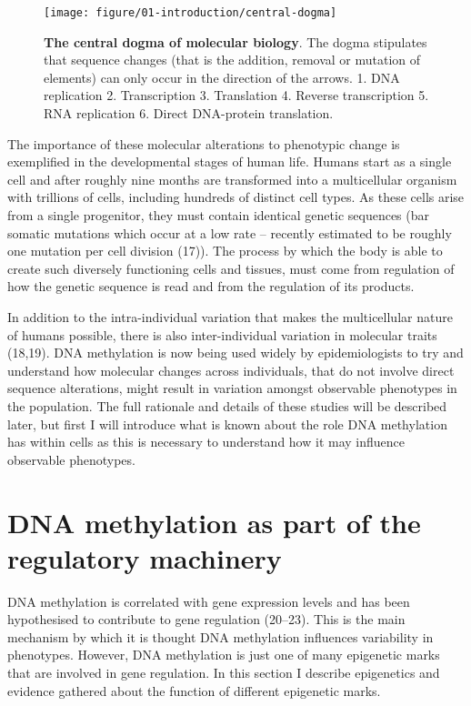 \documentclass[11pt,oneside]{bristolthesis}
\begin{document}
\begin{figure}

{\centering \texttt{[image: figure/01-introduction/central-dogma]} 

}

\caption[The central dogma of molecular biology]{\textbf{The central dogma of molecular biology}. The dogma stipulates that sequence changes (that is the addition, removal or mutation of elements) can only occur in the direction of the arrows. 1. DNA replication 2. Transcription 3. Translation 4. Reverse transcription 5. RNA replication 6. Direct DNA-protein translation.}\label{fig:central-dogma}
\end{figure}
The importance of these molecular alterations to phenotypic change is exemplified in the developmental stages of human life. Humans start as a single cell and after roughly nine months are transformed into a multicellular organism with trillions of cells, including hundreds of distinct cell types. As these cells arise from a single progenitor, they must contain identical genetic sequences (bar somatic mutations which occur at a low rate -- recently estimated to be roughly one mutation per cell division (17)). The process by which the body is able to create such diversely functioning cells and tissues, must come from regulation of how the genetic sequence is read and from the regulation of its products.

In addition to the intra-individual variation that makes the multicellular nature of humans possible, there is also inter-individual variation in molecular traits (18,19). DNA methylation is now being used widely by epidemiologists to try and understand how molecular changes across individuals, that do not involve direct sequence alterations, might result in variation amongst observable phenotypes in the population. The full rationale and details of these studies will be described later, but first I will introduce what is known about the role DNA methylation has within cells as this is necessary to understand how it may influence observable phenotypes.

\hypertarget{dnam-as-part-of-regulation}{%
\section{DNA methylation as part of the regulatory machinery}\label{dnam-as-part-of-regulation}}

DNA methylation is correlated with gene expression levels and has been hypothesised to contribute to gene regulation (20--23). This is the main mechanism by which it is thought DNA methylation influences variability in phenotypes. However, DNA methylation is just one of many epigenetic marks that are involved in gene regulation. In this section I describe epigenetics and evidence gathered about the function of different epigenetic marks.
\end{document}
